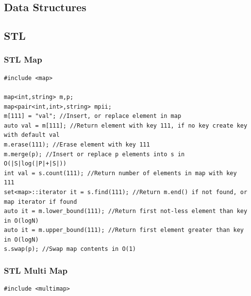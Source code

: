 \documentclass[twoside]{article}
\begin{document}
\selectfont
    \color{coolgray}
        \begin{multicols*}{2}
\tableofcontents
\newpage
{}
\sectionfont{\bfseries\sffamily\centering\Huge}
\vspace{1em}
\section*{Data Structures}
\vspace{3em}
\subsectionfont{\bfseries\sffamily\centering\LARGE}
\vspace{0em}
\subsection*{STL}
\vspace{2em}
\subsubsectionfont{\large\bfseries\sffamily\underline}
\subsubsection*{STL Map}
\begin{verbatim}
#include <map>

map<int,string> m,p;
map<pair<int,int>,string> mpii;
m[111] = "val"; //Insert, or replace element in map
auto val = m[111]; //Return element with key 111, if no key create key with default val
m.erase(111); //Erase element with key 111
m.merge(p); //Insert or replace p elements into s in O(|S|log(|P|+|S|))
int val = s.count(111); //Return number of elements in map with key 111
set<map>::iterator it = s.find(111); //Return m.end() if not found, or map iterator if found
auto it = m.lower_bound(111); //Return first not-less element than key in O(logN)
auto it = m.upper_bound(111); //Return first element greater than key in O(logN)
s.swap(p); //Swap map contents in O(1)

\end{verbatim}

\subsubsectionfont{\large\bfseries\sffamily\underline}
\subsubsection*{STL Multi Map}
\begin{verbatim}
#include <multimap>


\end{verbatim}
\end{multicols*}
\end{document}
